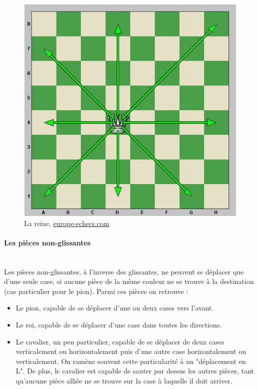 \documentclass{article}
\begin{document}
\newpage

\begin{figure}[h]
\centering
\includegraphics[scale=0.5]{img/mouvements_reine.jpg}
\caption{La reine,
\href{https://www.europe-echecs.com/art/2-le-deplacement-des-pieces-93.html}{europe-echecs.com}}
\end{figure}

\paragraph{Les pièces non-glissantes}
~~\\
Les pièces non-glissantes, à l'inverse des glissantes, ne peuvent se déplacer que d'une seule case, si aucune pièce de la même couleur ne se trouve à la destination (cas particulier pour le pion). Parmi ces pièces on retrouve :

\begin{itemize}
    \item Le pion, capable de se déplacer d'une ou deux cases vers l'avant.
    \item Le roi, capable de se déplacer d'une case dans toutes les directions.
    \item Le cavalier, un peu particulier, capable de se déplacer de deux cases verticalement ou horizontalement puis d'une autre case horizontalement ou verticalement. On ramène souvent cette particularité à un "déplacement en L". De plus, le cavalier est capable de sauter par dessus les autres pièces, tant qu'aucune pièce alliée ne se trouve sur la case à laquelle il doit arriver.
\end{itemize}
\end{document}

